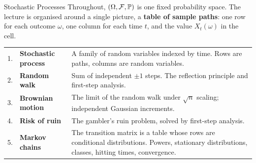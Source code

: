 \begin{frame}{Stochastic Processes}
  \small
  Throughout, $(\Omega,\mathcal{F},\mathbb{P})$ is one fixed probability space. The lecture is organised around a single picture, a \textbf{table of sample paths}: one row for each outcome $\omega$, one column for each time $t$, and the value $X_t(\omega)$ in the cell.
  \bigskip
  \renewcommand{\arraystretch}{1.7}
  \begin{tabular}{@{}r@{\ \ }>{\raggedright\arraybackslash}p{4.0cm}>{\raggedright\arraybackslash}p{8.8cm}@{}}
    1. & \textbf{Stochastic process} & A family of random variables indexed by time. Rows are paths, columns are random variables. \\
    2. & \textbf{Random walk} & Sum of independent $\pm1$ steps. The reflection principle and first-step analysis. \\
    3. & \textbf{Brownian motion} & The limit of the random walk under $\sqrt n$ scaling; independent Gaussian increments. \\
    4. & \textbf{Risk of ruin} & The gambler's ruin problem, solved by first-step analysis. \\
    5. & \textbf{Markov chains} & The transition matrix is a table whose rows are conditional distributions. Powers, stationary distributions, classes, hitting times, convergence. \\
  \end{tabular}
\end{frame}

